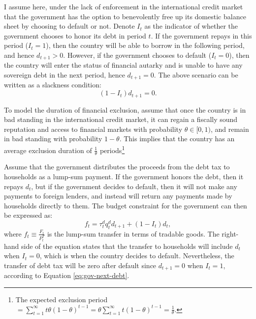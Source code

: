I assume here, under the lack of enforcement in the international credit market that the government has the option to benevolently free up its domestic balance sheet by choosing to default or not.
Denote $I_t$ as the indicator of whether the government chooses to honor its debt in period $t$. If the government repays in this period ($I_{t} = 1$), then the country will be able to borrow in the following period, and hence $d_{t+1} > 0$. However, if the government chooses to default ($I_t = 0$), then the country will enter the status of financial autarky and is unable to have any sovereign debt in the next period, hence $d_{t+1} = 0$. The above scenario can be written as a slackness condition:
\begin{equation}
    \label{eq:gov-next-debt}
    (1 - I_t)d_{t+1} = 0 .
\end{equation}

To model the duration of financial exclusion, assume that once the country is in bad standing in the international credit market, it can regain a fiscally sound reputation and access to financial markets with probability $\theta \in [0,1)$, and remain in bad standing with probability $1-\theta$. This implies that the country has an average exclusion duration of $\frac{1}{\theta}$ periods\footnote{
    The expected exclusion period $= \sum_{t=1}^{\infty} t \theta (1-\theta)^{t-1} = \theta  \sum_{t=1}^{\infty} t (1-\theta)^{t-1} = \frac{1}{\theta}$.
}

Assume that the government distributes the proceeds from the debt tax to households as a lump-sum payment. If the government honors the debt, then it repays $d_t$, but if the government decides to default, then it will not make any payments to foreign lenders, and instead will return any payments made by households directly to them. The budget constraint for the government can then be expressed as:
\begin{equation}
    \label{eq:gov-budget}
    f_t = \tau_t^d q_t^d d_{t+1} + (1-I_t)d_t,
\end{equation}
where $f_t \equiv \frac{F_t}{P^T_t}$ is the lump-sum transfer in terms of tradable goods. The right-hand side of the equation states that the transfer to households will include $d_t$ when $I_t = 0$, which is when the country decides to default. Nevertheless, the transfer of debt tax will be zero after default since $d_{t+1} = 0$ when $I_t = 1$, according to Equation \eqref{eq:gov-next-debt}.